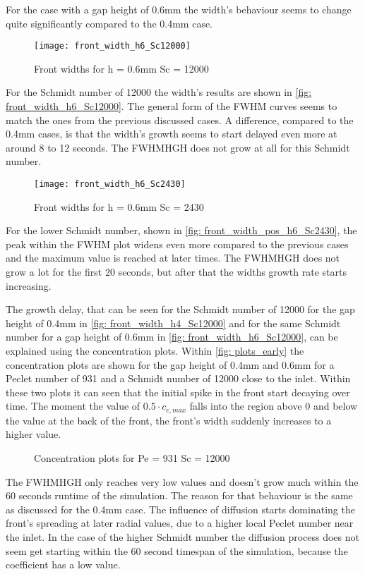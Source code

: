 \documentclass[../thesis.tex]{subfiles}
\begin{document}
For the case with a gap height of 0.6mm the width's behaviour seems to change quite significantly compared to the 0.4mm case. 
\begin{figure}[htb]
	\centering
	\texttt{[image: front\_width\_h6\_Sc12000]}
	\caption{Front widths for  h = 0.6mm Sc = 12000}
	\label{fig: front_width_h6_Sc12000}
\end{figure}
For the Schmidt number of 12000 the width's results are shown in \autoref{fig: front_width_h6_Sc12000}. The general form of the FWHM curves seems to match the ones from the previous discussed cases. A difference, compared to the 0.4mm cases, is that the width's growth seems to start delayed even more at around 8 to 12 seconds. The FWHMHGH does not grow at all for this Schmidt number.
\begin{figure}[htb]
	\centering
	\texttt{[image: front\_width\_h6\_Sc2430]}
	\caption{Front widths for  h = 0.6mm Sc = 2430}
	\label{fig: front_width_pos_h6_Sc2430}
\end{figure}
For the lower Schmidt number, shown in \autoref{fig: front_width_pos_h6_Sc2430}, the peak within the FWHM plot widens even more compared to the previous cases and the maximum value is reached at later times. The FWHMHGH does not grow a lot for the first 20 seconds, but after that the widths growth rate starts increasing.

The growth delay, that can be seen for the Schmidt number of 12000 for the gap height of 0.4mm in \autoref{fig: front_width_h4_Sc12000} and for the same Schmidt number for a gap height of 0.6mm in \autoref{fig: front_width_h6_Sc12000}, can be explained using the concentration plots. Within \autoref{fig: plots_early} the concentration plots are shown for the gap height of 0.4mm and 0.6mm for a Peclet number of 931 and a Schmidt number of 12000 close to the inlet. Within these two plots it can seen that the initial spike in the front start decaying over time. The moment the value of $0\text{.}5 \cdot c_{c,max}$ falls into the region above 0 and below the value at the back of the front, the front's width suddenly increases to a higher value.
\begin{figure}[htb]
	\centering
	\qquad
	\caption{Concentration plots for  Pe = 931 Sc = 12000}%
	\label{fig: plots_early}%
\end{figure}
The FWHMHGH only reaches very low values and doesn't grow much within the 60 seconds runtime of the simulation. The reason for that behaviour is the same as discussed for the 0.4mm case. The influence of diffusion starts dominating the front's spreading at later radial values, due to a higher local Peclet number near the inlet. In the case of the higher Schmidt number the diffusion process does not seem get starting within the 60 second timespan of the simulation, because the coefficient has a low value.
\newline 
\end{document}
